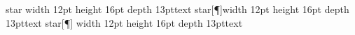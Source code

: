 \def\readspec@E{%
  \edef\next{\the\rtA}%
  \endnext
}

\def\readspec@V{%
  \edef\next{\the\rtB}%
  \endnext
  \readspec
}

\def\readspec@M{%
  \edef\next{\the\rtB}%
  \endnext
}

\def\readspec@B{%
  \getoptbracket\readspec@C
}

\def\readspec@C#1{%
  \rtA={#1}%
  \edef\next{\the\rtB{\the\rtA}\noexpand\readspec@S}%
  \endnext
}

\def\readspec@S{%
  \readblanks\then\readspec\done
}

\def\readspec@R{%
  \afterassignment\readspec@S
}

%
%

\def\testreadspec#1#{\testreadspec@M{#1}}

\def\testreadspec@M#1#2{%
  \rdA=0pt
  \rdB=0pt
  \rdC=0pt
  \readspecreset
  \def\readspecmandatory{%
    \\{{width}{\readspec@R\rdA}}%
    \\{{height}{\readspec@R\rdB}}%
    \\{{depth}{\readspec@R\rdC}}%
  }%
  \def\readspecbracket{%
    \\{{star}{\makestar}}%
  }%
  \def\makestar##1{%
    \def\makestar@x{##1}%
  }%
  \let\makestar@x\undefined
  We process the sequence
  \begindisplay
  \tt #1$\{$#2$\}$%
  \enddisplay
  through `readspec' now.
  \par
  \tt
  START\par
  \readspec#1{#2}\par
  STOP\par
  \normalfont
  \begindisplay\tt
  \indent
  \ifx\makestar@x\undefined\else
     \ifx\makestar@x\empty
       \llap{* }%
     \else
       \llap{\makestar@x\space}%
     \fi
  \fi
  rdA = \the\rdA\endgraf
  rdB = \the\rdB\endgraf
  rdC = \the\rdC\endgraf
  \enddisplay
}

\testreadspec star width 12pt height 16pt depth 13pt{text}
\testreadspec star[\P]width 12pt height 16pt depth 13pt{text}
\testreadspec star[\P] width 12pt height 16pt depth 13pt{text}


\meaning\ignoreblanks@l
\meaning\spacetoken
\meaning\tabtoken
\meaning\newlinetoken

\bye
